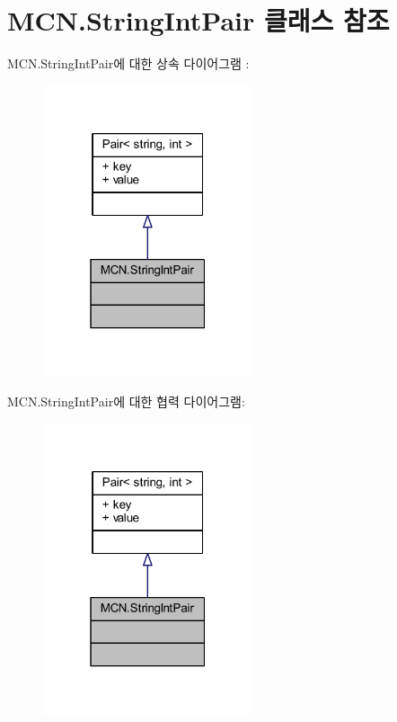 \hypertarget{class_m_c_n_1_1_string_int_pair}{}\section{M\+C\+N.\+String\+Int\+Pair 클래스 참조}
\label{class_m_c_n_1_1_string_int_pair}


M\+C\+N.\+String\+Int\+Pair에 대한 상속 다이어그램 \+: 
\nopagebreak
\begin{figure}[H]
\begin{center}
\leavevmode
\includegraphics[width=175pt]{class_m_c_n_1_1_string_int_pair__inherit__graph}
\end{center}
\end{figure}


M\+C\+N.\+String\+Int\+Pair에 대한 협력 다이어그램\+:
\nopagebreak
\begin{figure}[H]
\begin{center}
\leavevmode
\includegraphics[width=175pt]{class_m_c_n_1_1_string_int_pair__coll__graph}
\end{center}
\end{figure}
